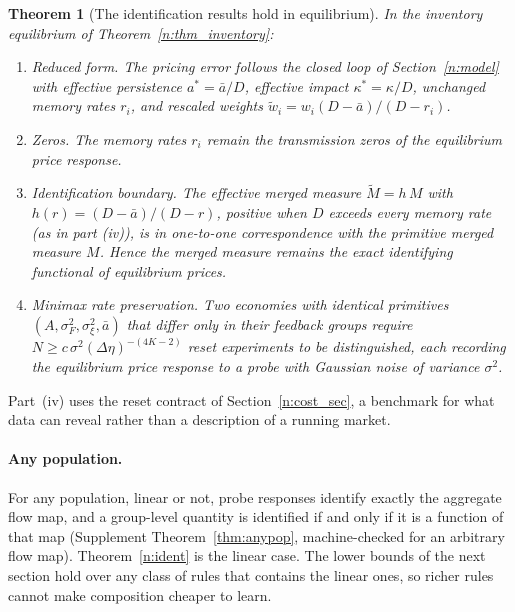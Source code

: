 \documentclass[12pt]{article}
\newtheorem{theorem}{Theorem}[section]
\theoremstyle{definition}
\theoremstyle{remark}
\begin{document}
\begin{theorem}[The identification results hold in equilibrium]\label{n:thm_eqreduced}
In the inventory equilibrium of Theorem~\ref{n:thm_inventory}:
\begin{enumerate}[label=(\roman*),itemsep=1pt]
\item \emph{Reduced form.} The pricing error follows the closed loop of Section~\ref{n:model} with effective persistence $a^*=\bar a/D$, effective impact $\kappa^*=\kappa/D$, unchanged memory rates $r_i$, and rescaled weights $\tilde w_i=w_i(D-\bar a)/(D-r_i)$.
\item \emph{Zeros.} The memory rates $r_i$ remain the transmission zeros of the equilibrium price response.
\item \emph{Identification boundary.} The effective merged measure $\tilde M=h\,M$ with $h(r)=(D-\bar a)/(D-r)$, positive when $D$ exceeds every memory rate (as in part (iv)), is in one-to-one correspondence with the primitive merged measure $M$. Hence the merged measure remains the exact identifying functional of equilibrium prices.
\item \emph{Minimax rate preservation.} Two economies with identical primitives $(A,\sigma_F^2,\sigma_\xi^2,\bar a)$ that differ only in their feedback groups require $N\ge c\,\sigma^2(\Delta\eta)^{-(4K-2)}$ reset experiments to be distinguished, each recording the equilibrium price response to a probe with Gaussian noise of variance $\sigma^2$.
\end{enumerate}
\end{theorem}

Part~(iv) uses the reset contract of Section~\ref{n:cost_sec}, a benchmark for what data can reveal rather than a description of a running market.


\paragraph{Any population.} For any population, linear or not, probe responses identify exactly the aggregate flow map, and a group-level quantity is identified if and only if it is a function of that map (Supplement Theorem~\ref{thm:anypop}, machine-checked for an arbitrary flow map). Theorem~\ref{n:ident} is the linear case. The lower bounds of the next section hold over any class of rules that contains the linear ones, so richer rules cannot make composition cheaper to learn.
\end{document}
